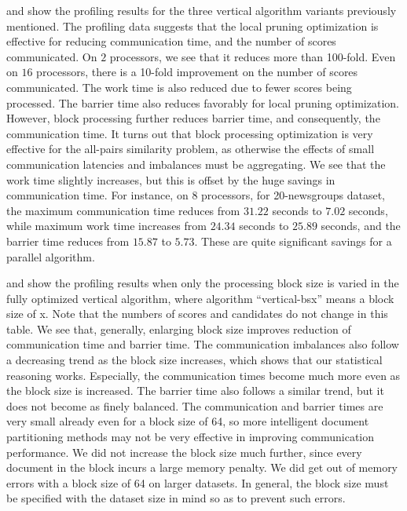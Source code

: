 \documentclass{comjnl}
\begin{document}
 and
 show the profiling results for
the three vertical algorithm variants previously mentioned.  The
profiling data suggests that the local pruning optimization is
effective for reducing communication time, and the number of scores
communicated. On $2$ processors, we see that it reduces more than
100-fold.  Even on $16$ processors, there is a 10-fold improvement on
the number of scores communicated. The work time is also reduced due
to fewer scores being processed. The barrier time also reduces
favorably for local pruning optimization. However, block processing
further reduces barrier time, and consequently, the communication
time. It turns out that block processing optimization is very
effective for the all-pairs similarity problem, as otherwise the
effects of small communication latencies and imbalances must be
aggregating. We see that the work time slightly increases, but this is
offset by the huge savings in communication time. For instance, on $8$
processors, for 20-newsgroups dataset, the maximum communication time
reduces from $31.22$ seconds to $7.02$ seconds, while maximum work
time increases from $24.34$ seconds to $25.89$ seconds, and the
barrier time reduces from $15.87$ to $5.73$. These are quite
significant savings for a parallel algorithm.

 and
 show the profiling results
when only the processing block size is varied in the fully optimized
vertical algorithm, where algorithm ``vertical-bsx'' means a block
size of x.  Note that the numbers of scores and candidates do not
change in this table. We see that, generally, enlarging block size improves
reduction of communication time and barrier time. The communication
imbalances also follow a decreasing trend as the block size increases,
which shows that our statistical reasoning works. Especially, the
communication times become much more even as the block size is
increased. The barrier time also follows a similar trend, but it does
not become as finely balanced.  The communication and barrier times
are very small already even for a block size of 64, so more
intelligent document partitioning methods may not be very effective in
improving communication performance.  We did not increase the block
size much further, since every document in the block incurs a large
memory penalty. We did get out of memory errors with a block size of
64 on larger datasets. In general, the block size must be specified
with the dataset size in mind so as to prevent such errors.
\end{document}
